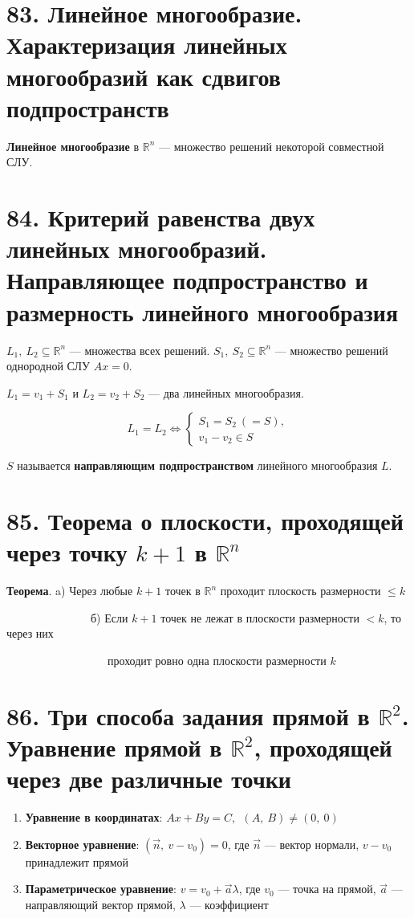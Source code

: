 \documentclass[a4paper, 12pt]{article}
\newcommand{\R}{\mathbb{R}}
\begin{document}
\section*{83. Линейное многообразие. Характеризация линейных многообразий как сдвигов подпространств}
\textbf{Линейное многообразие} в $\R^n$ --- множество решений некоторой совместной СЛУ.

\section*{84. Критерий равенства двух линейных многообразий. Направляющее подпространство и размерность линейного многообразия}
$L_1,\ L_2 \subseteq \R^n$ --- множества всех решений. $S_1,\ S_2 \subseteq \R^n$ --- множество решений однородной СЛУ $Ax = 0$.

$L_1 = v_1 + S_1$ и $L_2 = v_2 + S_2$ --- два линейных многообразия.

\vspace{-2mm}
\[
L_1 = L_2 \Longleftrightarrow
\begin{cases*}
S_1 = S_2\ (=S), \\
v_1 - v_2 \in S
\end{cases*}
\]

$S$ называется \textbf{направляющим подпространством} линейного многообразия $L$.

\section*{85. Теорема о плоскости, проходящей через точку $k + 1$ в $\R^n$}
\textbf{Теорема}. a) Через любые $k + 1$ точек в $\R^n$ проходит плоскость размерности $\leqslant k$

\ \ \ \ \ \ \ \ \ \ \ \ \ \ \ б) Если $k + 1$ точек не лежат в плоскости размерности $< k$, то через них

\ \ \ \ \ \ \ \ \ \ \ \ \ \ \ \ \ \ проходит ровно одна плоскости размерности $k$

\section*{86. Три способа задания прямой в $\R^2$. Уравнение прямой в $\R^2$, проходящей через две различные точки}
\begin{enumerate}
    \itemsep0em
    \item \textbf{Уравнение в координатах}: $Ax + By = C,\ \ (A,\ B) \neq (0,\ 0)$
    \item \textbf{Векторное уравнение}: $(\vec{n},\ v - v_0) = 0$, где $\vec n$ --- вектор нормали, $v - v_0$ принадлежит прямой
    \item \textbf{Параметрическое уравнение}: $v = v_0 + \vec{a}\lambda$, где $v_0$ --- точка на прямой, $\vec{a}$ --- направляющий вектор прямой, $\lambda$ --- коэффициент
\end{enumerate}
\end{document}
